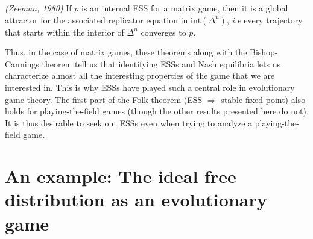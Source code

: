 \begin{theorem}\emph{(Zeeman, 1980) }
	If $p$ is an internal ESS for a matrix game, then it is a global attractor for the associated replicator equation in $\textrm{int}(\Delta^n)$, \textit{i.e} every trajectory that starts within the interior of $\Delta^n$ converges to $p$.
\end{theorem}
Thus, in the case of matrix games, these theorems along with the Bishop-Cannings theorem tell us that identifying ESSs and Nash equilibria lets us characterize almost all the interesting properties of the game that we are interested in. This is why ESSs have played such a central role in evolutionary game theory. The first part of the Folk theorem (ESS $\Rightarrow$ stable fixed point) also holds for playing-the-field games (though the other results presented here do not). It is thus desirable to seek out ESSs even when trying to analyze a playing-the-field game.

\section{An example: The ideal free distribution as an evolutionary game}

